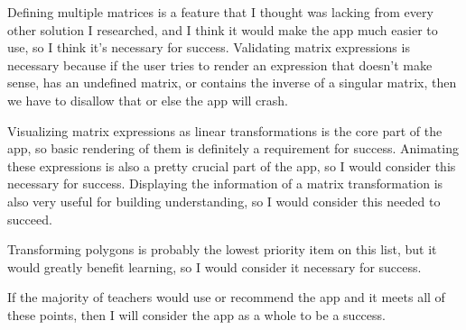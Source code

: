 \documentclass[../main.tex]{subfiles}
\begin{document}
Defining multiple matrices is a feature that I thought was lacking from every other solution I researched, and I think it would make the app much easier to use, so I think it's necessary for success. Validating matrix expressions is necessary because if the user tries to render an expression that doesn't make sense, has an undefined matrix, or contains the inverse of a singular matrix, then we have to disallow that or else the app will crash.

Visualizing matrix expressions as linear transformations is the core part of the app, so basic rendering of them is definitely a requirement for success. Animating these expressions is also a pretty crucial part of the app, so I would consider this necessary for success. Displaying the information of a matrix transformation is also very useful for building understanding, so I would consider this needed to succeed.

Transforming polygons is probably the lowest priority item on this list, but it would greatly benefit learning, so I would consider it necessary for success.

If the majority of teachers would use or recommend the app and it meets all of these points, then I will consider the app as a whole to be a success.
\end{document}
